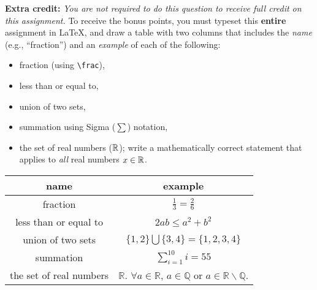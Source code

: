\documentclass[11pt,addpoints]{exam}
\begin{document}
\begin{questions}
   

  \bonusquestion[10] \textbf{Extra credit:} \emph{You are not required to do this question to receive full credit on this assignment.}
  To receive the bonus points, you must typeset this \textbf{entire} assignment in \LaTeX, and draw a table with two columns that includes the \emph{name} (e.g., ``fraction'') and an \emph{example} of each of the following:
  \begin{itemize}
  \item fraction (using \texttt{\textbackslash frac}),
  \item less than or equal to,
  \item union of two sets,
  \item summation using Sigma ($\sum$) notation,
  \item the set of real numbers ($\mathbb{R}$); write a mathematically correct statement that applies to \emph{all} real numbers $x\in \mathbb{R}$.
  \end{itemize}
  
  \begin{solution}
    \begin{tabular}{|c|c|}
    \hline
    \textbf{name} & \textbf{example} \\
    \hline
    fraction & $\frac{1}{3} = \frac{2}{6}$ \\
    \hline
    less than or equal to & $2ab \leq a^2 + b^2$\\
    \hline
    union of two sets & $\{1,2\} \bigcup \{3,4\} = \{1,2,3,4\}$ \\
    \hline
    summation & $\sum_{i=1}^{10} i= 55 $\\
    \hline
    the set of real numbers & $\mathbb{R}.$ $\forall a\in \mathbb{R}$, $a \in \mathbb{Q}$ or $a \in \mathbb{R} \backslash \mathbb{Q}$.\\
    \hline
  \end{tabular}
  \end{solution} 
\end{questions}
\end{document}
